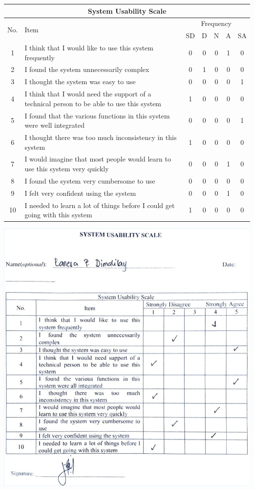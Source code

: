 \begin{center}
	\begin{tabular}{|c|p{8cm}|c|c|c|c|c|}
		\hline
		\multicolumn{7}{|c|}{\textbf{System Usability Scale}} \\
		\hline
		\multirow{2}{*}{No.} & \multirow{2}{*}{Item} & \multicolumn{5}{c|}{Frequency} \\
		\cline{3-7}
		& & SD & D & N & A & SA \\
		\hline
		1 & I think that I would like to use this system frequently & 0 & 0 & 0 & 1 & 0 \\
		\hline
		2 & I found the system unnecessarily complex & 0 & 1 & 0 & 0 & 0 \\
		\hline
		3 & I thought the system was easy to use & 0 & 0 & 0 & 0 & 1 \\
		\hline
		4 & I think that I would need the support of a technical person to be able to use this system & 1 & 0 & 0 & 0 & 0 \\
		\hline
		5 & I found that the various functions in this system were well integrated & 0 & 0 & 0 & 0 & 1 \\
		\hline
		6 & I thought there was too much inconsistency in this system & 1 & 0 & 0 & 0 & 0 \\
		\hline
		7 & I would imagine that most people would learn to use this system very quickly & 0 & 0 & 0 & 1 & 0 \\
		\hline
		8 & I found the system very cumbersome to use & 0 & 0 & 0 & 0 & 0 \\
		\hline
		9 & I felt very confident using the system & 0 & 0 & 0 & 1 & 0 \\
		\hline
		10 & I needed to learn a lot of things before I could get going with this system & 1 & 0 & 0 & 0 & 0 \\
		\hline
	\end{tabular}
	\includegraphics[width=1\textwidth]{app/G.pdf}
\end{center}

